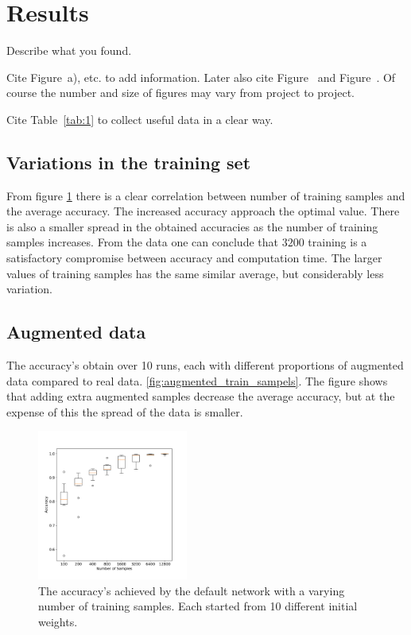 \documentclass[prl,twocolumn]{revtex4-1}
\begin{document}
\section{Results}


Describe what you found.

Cite Figure~a), etc. to add information. Later also cite Figure~ and  Figure~. Of course the number and size of figures may vary from project to project.

Cite Table~\ref{tab:1} to collect useful data in a clear way.

\subsection{Variations in the training set}

From figure \ref{fig:num_train_samples} there is a clear correlation between number of training samples and the average accuracy. The increased accuracy approach the optimal value. There is also a smaller spread in the obtained accuracies as the number of training samples increases. From the data one can conclude that $3200$ training is a satisfactory compromise between accuracy and computation time. The larger values of training samples has the same similar average, but considerably less variation. 


\subsection{Augmented data}
The accuracy's obtain over 10 runs, each with different proportions of augmented data compared to real data. \ref{fig:augmented_train_sampels}. The figure shows that adding extra augmented samples decrease the average accuracy, but at the expense of this the spread of the data is smaller.


\begin{figure}[ht]
  \includegraphics[width=0.44\textwidth]{num_train_box.pdf}
  \caption{The accuracy's achieved by the default network with a varying number of training samples. Each started from 10 different initial weights.}
  \label{fig:num_train_samples}
\end{figure}
\end{document}
